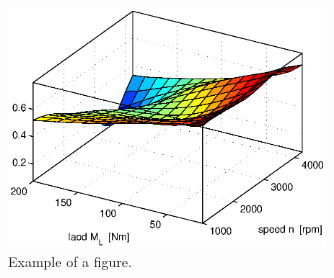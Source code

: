 \begin{figure}[ht]
   \centering
   \includegraphics[width=0.75\textwidth]{img/k_surf.eps}
   \caption{Example of a figure.}
   \label{img:k_surf}
\end{figure}

